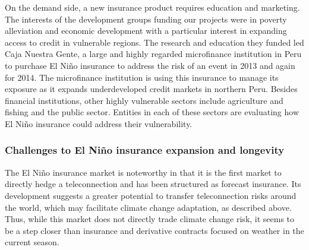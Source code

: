 \documentclass[authoryear]{article}
\begin{document}
On the demand side, a new insurance product requires education and marketing. The interests of the development groups funding our projects were in poverty alleviation and economic development with a particular interest in expanding access to credit in vulnerable regions. The research and education they funded led Caja Nuestra Gente, a large and highly regarded microfinance institution in Peru to purchase El Ni\~no insurance to address the risk of an event in 2013 and again for 2014. The microfinance institution is using this insurance to manage its exposure as it expands underdeveloped credit markets in northern Peru. Besides financial institutions, other highly vulnerable sectors include agriculture and fishing and the public sector. Entities in each of these sectors are evaluating how El Ni\~no insurance could address their vulnerability.


\subsubsection{Challenges to El Ni\~no insurance expansion and longevity}
The El Ni\~no insurance market is noteworthy in that it is the first market to directly hedge a teleconnection and has been structured as forecast insurance. Its development suggests a greater potential to transfer teleconnection risks around the world, which may facilitate climate change adaptation, as described above. Thus, while this market does not directly trade climate change risk, it seems to be a step closer than insurance and derivative contracts focused on weather in the current season. 
\end{document}
